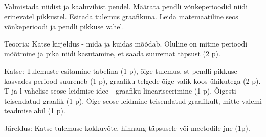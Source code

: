 
Valmistada niidist ja kaaluvihist pendel. Määrata pendli võnkeperioodid niidi erinevatel pikkustel. Esitada tulemus graafikuna. Leida matemaatiline seos võnkeperioodi ja pendli pikkuse vahel.

\hint

\solu
Teooria: Katse kirjeldus - mida ja kuidas mõõdab. Oluline on mitme perioodi mõõtmine ja pika niidi kasutamine, et saada suuremat täpsust (2 p).

Katse: Tulemuste esitamine tabelina (1 p), õige tulemus, st pendli pikkuse kasvades periood suureneb (1 p), graafiku telgede õige valik koos ühikutega (2 p). T ja l vahelise seose leidmise idee - graafiku lineariseerimine (1 p). Õigesti teisendatud graafik (1 p). Õige seose leidmine teisendatud graafikult, mitte valemi teadmise abil (1 p).

Järeldus: Katse tulemuse kokkuvõte, hinnang täpsusele või meetodile jne (1p).
\probend
